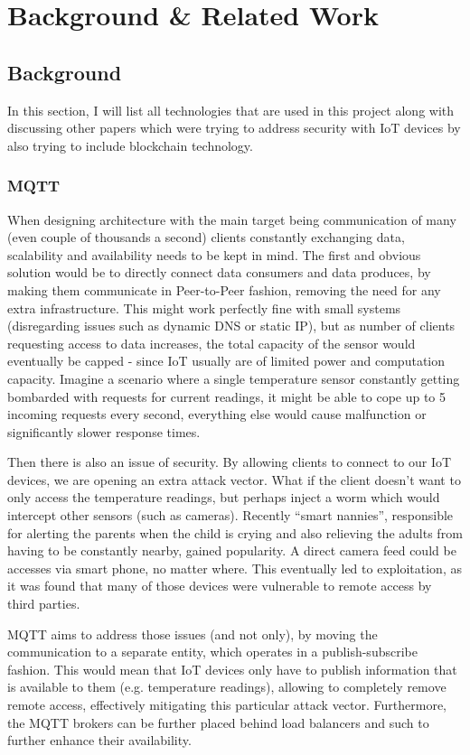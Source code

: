 \chapter{Background \& Related Work}
\section{Background}
In this section, I will list all technologies that are used in this project along with discussing other papers which were trying to address security with IoT devices by also trying to include blockchain technology.
\subsection{MQTT}
When designing architecture with the main target being communication of many (even couple of thousands a second) clients constantly exchanging data, scalability and availability needs to be kept in mind. The first and obvious solution would be to directly connect data consumers and data produces, by making them communicate in Peer-to-Peer fashion, removing the need for any extra infrastructure. This might work perfectly fine with small systems (disregarding issues such as dynamic DNS or static IP), but as number of clients requesting access to data increases, the total capacity of the sensor would eventually be capped - since IoT usually are of limited power and computation capacity. Imagine a scenario where a single temperature sensor constantly getting bombarded with requests for current readings, it might be able to cope up to 5 incoming requests every second, everything else would cause malfunction or significantly slower response times.

Then there is also an issue of security. By allowing clients to connect to our IoT devices, we are opening an extra attack vector. What if the client doesn't want to only access the temperature readings, but perhaps inject a worm which would intercept other sensors (such as cameras). Recently ``smart nannies'', responsible for alerting the parents when the child is crying and also relieving the adults from having to be constantly nearby, gained popularity. A direct camera feed could be accesses via smart phone, no matter where. This eventually led to exploitation, as it was found that many of those devices were vulnerable to remote access by third parties\cite{pultarova2016webcam}.

MQTT aims to address those issues (and not only), by moving the communication to a separate entity, which operates in a publish-subscribe fashion. This would mean that IoT devices only have to publish information that is available to them (e.g. temperature readings), allowing to completely remove remote access, effectively mitigating this particular attack vector. Furthermore, the MQTT brokers can be further placed behind load balancers and such to further enhance their availability.

